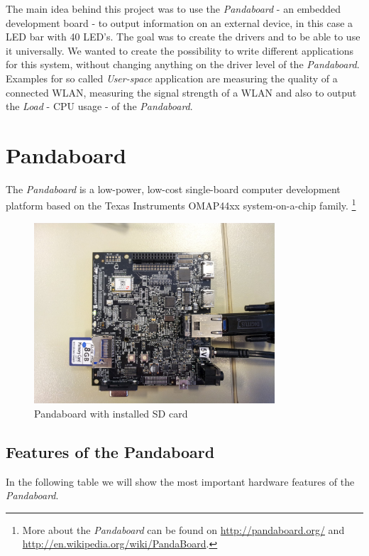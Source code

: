 The main idea behind this project was to use the \textit{Pandaboard} - an embedded development board - to output information on an external device, in this case a LED bar with 40 LED's. The goal was to create the drivers and to be able to use it universally. We wanted to create the possibility to write different applications for this system, without changing anything on the driver level of the \textit{Pandaboard}. 
Examples for so called \textit{User-space} application are measuring the quality of a connected WLAN, measuring the signal strength of a WLAN and also to output the \textit{Load} - CPU usage - of the \textit{Pandaboard}.

\section{Pandaboard}
The \textit{Pandaboard} is a low-power, low-cost single-board computer development platform based on the Texas Instruments OMAP44xx system-on-a-chip family. \footnote{More about the \textit{Pandaboard} can be found on \url{http://pandaboard.org/}  and  \url{http://en.wikipedia.org/wiki/PandaBoard}.} 

\begin{figure}[H]
   \centering
   \includegraphics[width=0.8\textwidth]{img/Pandaboard_Alone.jpg}%
   \caption{Pandaboard with installed SD card}
   \label{fig:pandaBoard_Alone}%
\end{figure}

\newpage
\subsection{Features of the Pandaboard}
In the following table we will show the most important hardware features of the \textit{Pandaboard}.

